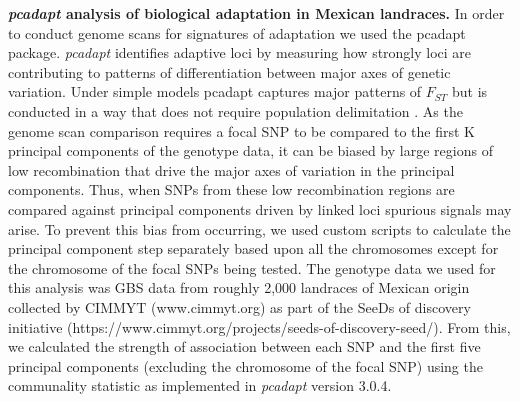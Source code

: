\documentclass[9pt,twocolumn,twoside,lineno]{BioRxiv}
\begin{document}
\textbf{\textit{pcadapt} analysis of biological adaptation in Mexican landraces.}
In order to conduct genome scans for signatures of adaptation we used the pcadapt \cite{Luu2017-ws} package.
\textit{pcadapt} identifies adaptive loci by measuring how strongly loci are contributing to patterns of differentiation between major axes of genetic variation.
Under simple models  pcadapt captures major patterns of $F_{ST}$  but is conducted in a way that does not require population delimitation \cite{duforet2014genome}.
As the genome scan comparison requires a focal SNP to be compared to the first K principal components of the genotype data, it can be biased by large regions of low recombination that drive the major axes of variation in the principal components.
Thus, when SNPs from these low recombination regions are compared against principal components driven by linked loci spurious signals may arise.
To prevent this bias from occurring, we used custom scripts to calculate the principal component step separately based upon all the chromosomes except for the chromosome of the focal SNPs being tested.
The genotype data we used for this analysis was GBS data from roughly 2,000 landraces of Mexican origin collected by CIMMYT (www.cimmyt.org) as part of the SeeDs of discovery initiative (https://www.cimmyt.org/projects/seeds-of-discovery-seed/).
From this, we calculated the strength of association between each SNP and the first five principal components (excluding the chromosome of the focal SNP) using the communality statistic as implemented in \textit{pcadapt} version 3.0.4.
\end{document}
